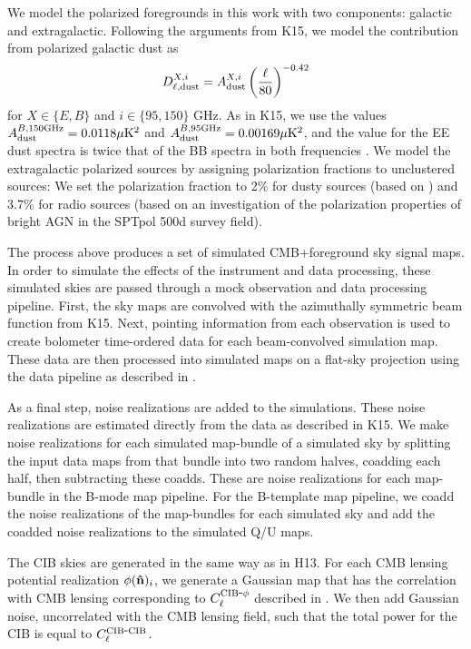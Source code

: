 We model the polarized foregrounds in this work with two components: galactic and extragalactic.
Following the arguments from K15, we model the contribution from polarized galactic dust as
\begin{equation*}
  D_{\ell,\mathrm{dust}}^{X,i} = A_{\rm dust}^{X,i} \left(\frac{\ell}{80}\right)^{-0.42}
\end{equation*}
for $X\in\{E,B\}$ and $i \in\{95,150\}$ GHz.
As in K15, we use the values $A_{\rm dust}^{B, 150 \rm GHz} = 0.0118\mu{\rm K}^2$ and $A_{\rm dust}^{B, 95 \rm GHz} = 0.00169\mu{\rm K}^2$,
and the value for the EE dust spectra is twice that of the BB spectra in both frequencies \citep{2016A&A...586A.133P}.
We model the extragalactic polarized sources by assigning polarization fractions to unclustered sources:
We set the polarization fraction to 2\% for dusty sources (based on \citealt{seiffert07}) and 3.7\% for radio sources (based on an investigation of the polarization properties of bright AGN in the SPTpol 500d survey field).

The process above produces a set of simulated CMB+foreground sky signal maps.
In order to simulate the effects of the \sptpol instrument and data processing, these simulated skies are passed through a mock observation and data processing pipeline.
First, the sky maps are convolved with the azimuthally symmetric beam function from K15.
Next, \sptpol pointing information from each observation is used to create bolometer time-ordered data for each beam-convolved simulation map.
These data are then processed into simulated maps on a flat-sky projection using the data pipeline as described in .

As a final step, noise realizations are added to the simulations.
These noise realizations are estimated directly from the data as described in K15.
We make noise realizations for each simulated map-bundle of a simulated sky by
splitting the input data maps from that bundle into two random halves, coadding each half, then subtracting these coadds.
These are noise realizations for each map-bundle in the B-mode map pipeline.
For the B-template map pipeline, we coadd the noise realizations of the map-bundles for each simulated sky
and add the coadded noise realizations to the simulated Q/U maps.

The CIB skies are generated in the same way as in H13.
For each CMB lensing potential realization $\phi(\mathbf{\hat{n}})_i$, we generate a Gaussian map that has the correlation with CMB lensing corresponding to $C_{\ell}^{{\rm CIB}\mbox{-}\phi}$ described in .
We then add Gaussian noise, uncorrelated with the CMB lensing field, such that the total power for the CIB is equal to $C_{\ell}^{{\rm CIB}\mbox{-}{\rm CIB}}$.

